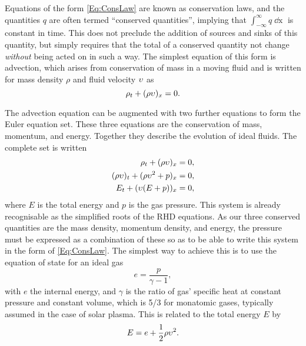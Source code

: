 Equations of the form \eqref{Eq:ConsLaw} are known as conservation laws, and the quantities $q$ are often termed ``conserved quantities'', implying that $\int_{-\infty}^{\infty} q \mathop{\dd{}x}$ is constant in time.
This does not preclude the addition of sources and sinks of this quantity, but simply requires that the total of a conserved quantity not change \emph{without} being acted on in such a way.
The simplest equation of this form is advection, which arises from conservation of mass in a moving fluid and is written for mass density $\rho$ and fluid velocity $\upsilon$ as
\begin{equation}\label{Eq:Advection}
    \rho_t + (\rho \upsilon)_x = 0.
\end{equation}

The advection equation can be augmented with two further equations to form the Euler equation set.
These three equations are the conservation of mass, momentum, and energy.
Together they describe the evolution of ideal fluids.
The complete set is written
\begin{equation}\label{Eq:EulerEqns}
\begin{split}
    \rho_t + (\rho \upsilon)_x &= 0,\\
    (\rho \upsilon)_t + (\rho \upsilon^2 + p)_x &= 0,\\
    E_t + (\upsilon(E + p))_x &= 0,
\end{split}
\end{equation}
where $E$ is the total energy and $p$ is the gas pressure.
This system is already recognisable as the simplified roots of the RHD equations.
As our three conserved quantities are the mass density, momentum density, and energy, the pressure must be expressed as a combination of these so as to be able to write this system in the form of \eqref{Eq:ConsLaw}.
The simplest way to achieve this is to use the equation of state for an ideal gas
\begin{equation}
    e = \frac{p}{\gamma-1},
\end{equation}
with $e$ the internal energy, and $\gamma$ is the ratio of gas' specific heat at constant pressure and constant volume, which is 5/3 for monatomic gases, typically assumed in the case of solar plasma.
This is related to the total energy $E$ by
\begin{equation}
    E = e + \frac{1}{2}\rho \upsilon^2.
\end{equation}

